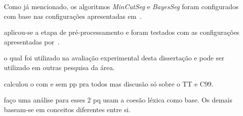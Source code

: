 Como já mencionado, os algoritmos \textit{MinCutSeg} e \textit{BayesSeg} foram configurados com base nas configurações apresentadas em~\cite{Eis2008}. 





aplicou-se a etapa de pré-processamento e foram testados com as configurações apresentadas por~\cite{Eis2008}. 































o qual foi utilizado na avaliação experimental desta dissertação e pode ser utilizado em outras pesquisa da área.









































calculou o com e sem pp pra todos
mas discusão só sobre o TT e C99.

faço uma análise para esses 2 pq usam a coesão léxica como base. Os demais baseam-se em conceitos diferentes entre si.











































